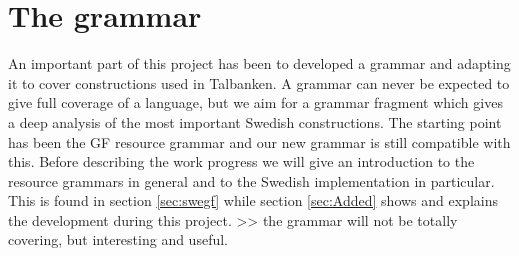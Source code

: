 \documentclass{report}
\begin{document}
\chapter{The grammar}
\label{sec:prog.grammar}
An important part of this project has been to developed a grammar and
adapting it to cover
constructions used in Talbanken. A grammar can never be expected to give
full coverage of a language, but we aim for a grammar fragment which gives a deep
analysis of the most important Swedish constructions.
The starting point has been the GF resource grammar and our new grammar is
still compatible with this.
Before describing the work progress we will give an introduction to the
resource grammars in general and to the Swedish implementation in particular.
This is found in section \ref{sec:swegf} while section \ref{sec:Added} shows and
explains the development during this project.
>> the grammar will not be totally covering, but interesting and useful.

\end{document}
